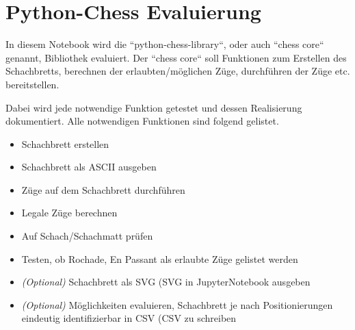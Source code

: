     \section{Python-Chess Evaluierung}\label{python-chess-evaluierung}

In diesem Notebook wird die ``python-chess-library``, oder auch ``chess
core`` genannt, Bibliothek evaluiert. Der ``chess core`` soll Funktionen
zum Erstellen des Schachbretts, berechnen der erlaubten/möglichen Züge,
durchführen der Züge etc. bereitstellen.

Dabei wird jede notwendige Funktion getestet und dessen Realisierung
dokumentiert. Alle notwendigen Funktionen sind folgend gelistet.

\begin{itemize}
\tightlist
\item
  Schachbrett erstellen
\item
  Schachbrett als ASCII ausgeben
\item
  Züge auf dem Schachbrett durchführen
\item
  Legale Züge berechnen
\item
  Auf Schach/Schachmatt prüfen
\item
  Testen, ob Rochade, En Passant als erlaubte Züge gelistet werden
\item
  \emph{(Optional)} Schachbrett als \acs{SVG} (\acl{SVG} in JupyterNotebook ausgeben
\item
  \emph{(Optional)} Möglichkeiten evaluieren, Schachbrett je nach
  Positionierungen eindeutig identifizierbar in \acs{CSV} (\acl{CSV} zu schreiben
\end{itemize}

